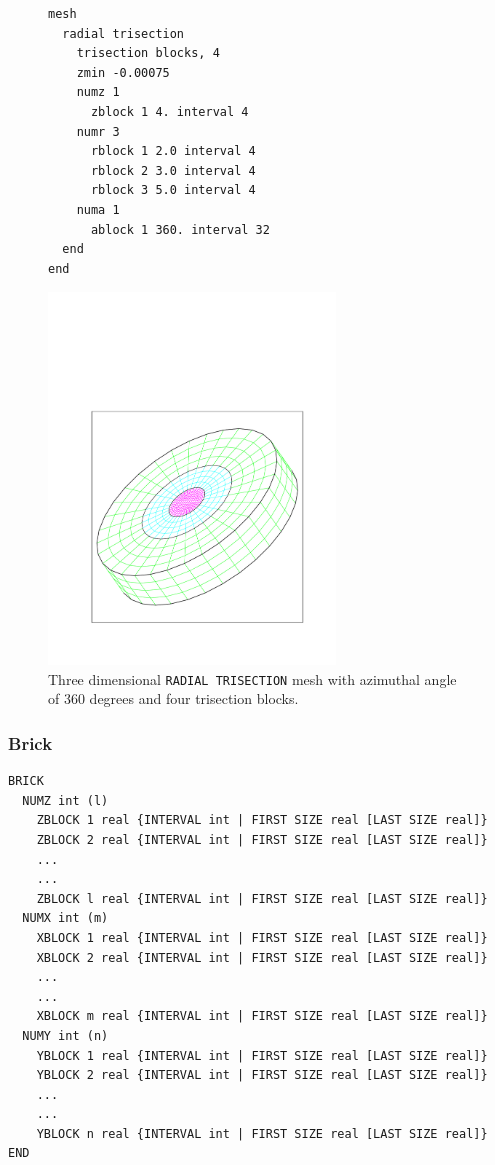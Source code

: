 \begin{figure}[htbp]
\centering
  \begin{minipage}[c]{0.4\linewidth}
    \centering
{\ttfamily \begin{verbatim}
mesh
  radial trisection
    trisection blocks, 4
    zmin -0.00075
    numz 1
      zblock 1 4. interval 4
    numr 3
      rblock 1 2.0 interval 4
      rblock 2 3.0 interval 4
      rblock 3 5.0 interval 4
    numa 1
      ablock 1 360. interval 32
  end
end
\end{verbatim}}
  \end{minipage}%
  \hfil
  \begin{minipage}[c]{0.6\linewidth}
    \centering
      \includegraphics[width=3.0in]{figures/cubit_radial_trisection2}
  \end{minipage}
  \caption [A 360 degree \texttt{RADIAL TRISECTION} mesh.] {Three dimensional \texttt{RADIAL TRISECTION} mesh with azimuthal
    angle of 360 degrees and four trisection blocks.}
  \label{fig:cubit_radial_trisect2}
\end{figure}


\clearpage
\subsubsection {Brick}

{\ttfamily \begin{verbatim}
BRICK
  NUMZ int (l)
    ZBLOCK 1 real {INTERVAL int | FIRST SIZE real [LAST SIZE real]}
    ZBLOCK 2 real {INTERVAL int | FIRST SIZE real [LAST SIZE real]}
    ...
    ...
    ZBLOCK l real {INTERVAL int | FIRST SIZE real [LAST SIZE real]}
  NUMX int (m)
    XBLOCK 1 real {INTERVAL int | FIRST SIZE real [LAST SIZE real]}
    XBLOCK 2 real {INTERVAL int | FIRST SIZE real [LAST SIZE real]}
    ...
    ...
    XBLOCK m real {INTERVAL int | FIRST SIZE real [LAST SIZE real]}
  NUMY int (n)
    YBLOCK 1 real {INTERVAL int | FIRST SIZE real [LAST SIZE real]}
    YBLOCK 2 real {INTERVAL int | FIRST SIZE real [LAST SIZE real]}
    ...
    ...
    YBLOCK n real {INTERVAL int | FIRST SIZE real [LAST SIZE real]}
END
\end{verbatim}
}

